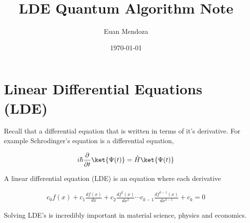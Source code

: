 \documentclass[11pt]{article}
\author{Euan Mendoza}
\date{\today}
\title{LDE Quantum Algorithm Note}
\begin{document}
\maketitle
\tableofcontents

\section{Linear Differential Equations (LDE)}
\label{sec:orgd8b0fd8}

Recall that a differential equation that is written in terms of it's derivative. For example Schrodinger's equation is a differential equation,

\begin{align}
i\hbar \frac{\partial}{\partial t} \ket{\Psi(t)} = \hat{H}\ket{\Psi(t)}
\end{align}

A linear differential equation (LDE) is an equation where each derivative

\begin{align}
c_{0}f(x) + c_{1}\frac{df(x)}{dx} + c_{2}\frac{df^{2}(x)}{dx^{2}}\cdots c_{k-1}\frac{df^{k-1}(x)}{dx^{k-1}} + c_{k} = 0
\end{align}

Solving LDE's is incredibly important in material science, physics and economics.
\end{document}
